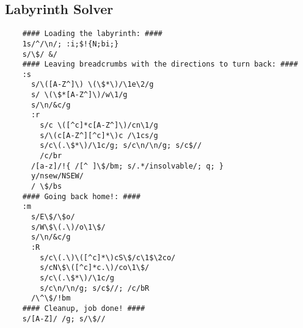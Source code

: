 
\subsection{Labyrinth Solver}


\begin{Verbatim}
	#### Loading the labyrinth: ####
	1s/^/\n/; :i;$!{N;bi;}
	s/\$/ &/
	#### Leaving breadcrumbs with the directions to turn back: ####
	:s
	  s/\([A-Z^]\) \(\$*\)/\1e\2/g
	  s/ \(\$*[A-Z^]\)/w\1/g
	  s/\n/&c/g
	  :r
	    s/c \([^c]*c[A-Z^]\)/cn\1/g
	    s/\(c[A-Z^][^c]*\)c /\1cs/g
	    s/c\(.\$*\)/\1c/g; s/c\n/\n/g; s/c$//
	    /c/br
	  /[a-z]/!{ /[^ ]\$/bm; s/.*/insolvable/; q; }
	  y/nsew/NSEW/
	  / \$/bs
	#### Going back home!: ####
	:m
	  s/E\$/\$o/
	  s/W\$\(.\)/o\1\$/
	  s/\n/&c/g
	  :R
	    s/c\(.\)\([^c]*\)cS\$/c\1$\2co/
	    s/cN\$\([^c]*c.\)/co\1\$/
	    s/c\(.\$*\)/\1c/g
	    s/c\n/\n/g; s/c$//; /c/bR
	  /\^\$/!bm
	#### Cleanup, job done! ####
	s/[A-Z]/ /g; s/\$//
\end{Verbatim}





